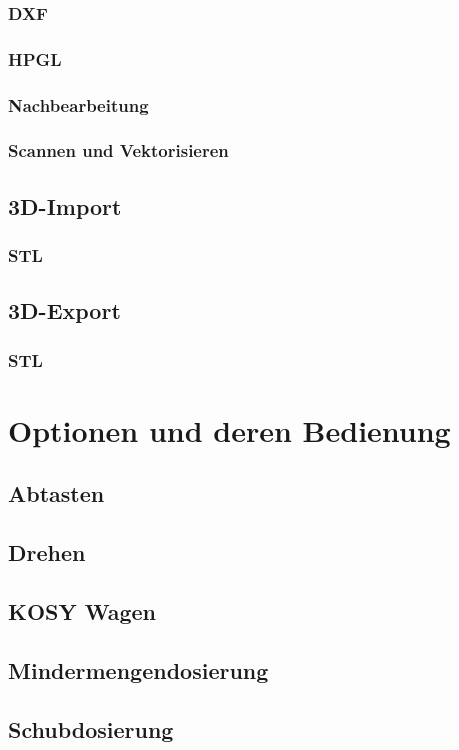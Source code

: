 \documentclass[14pt,a4paper]{book}
\begin{document}
		\subsection{DXF}
		\subsection{HPGL} 
		\subsection{Nachbearbeitung} 
		\subsection{Scannen und Vektorisieren} 
	\section{3D-Import} 
		\subsection{STL}
	\section{3D-Export} 
		\subsection{STL}

\chapter{Optionen und deren Bedienung} 
	\section{Abtasten}
	\section{Drehen} 
	\section{KOSY Wagen} 
	\section{Mindermengendosierung} 
	\section{Schubdosierung} 
\end{document}
